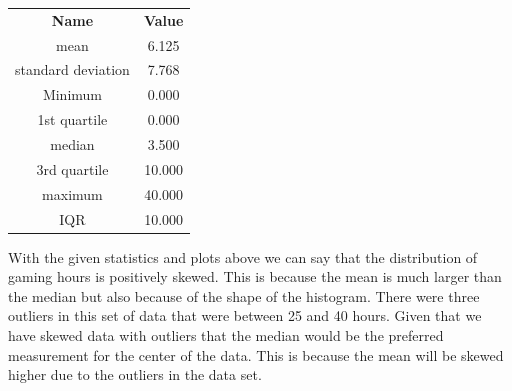 \documentclass[letterpaper, onecolumn,10pt]{IEEEtran}
\begin{document}
            
            \begin{table}[H]
                \begin{tabular}{|c|c|}
                    \textbf{Name} & \textbf{Value}\\
                    mean & 6.125\\
                    standard deviation & 7.768 \\
                    Minimum & 0.000\\
                    1st quartile & 0.000\\
                    median & 3.500\\
                    3rd quartile & 10.000\\
                    maximum & 40.000\\
                    IQR & 10.000\\
                \end{tabular}
            \end{table}
            
            With the given statistics and plots above we can say that the distribution of gaming hours is positively skewed. This is because the mean is much larger than the median but also because of the shape of the histogram. There were three outliers in this set of data that were between 25 and 40 hours. Given that we have skewed data with outliers that the median would be the preferred measurement for the center of the data. This is because the mean will be skewed higher due to the outliers in the data set.\\
            
            
\end{document}
